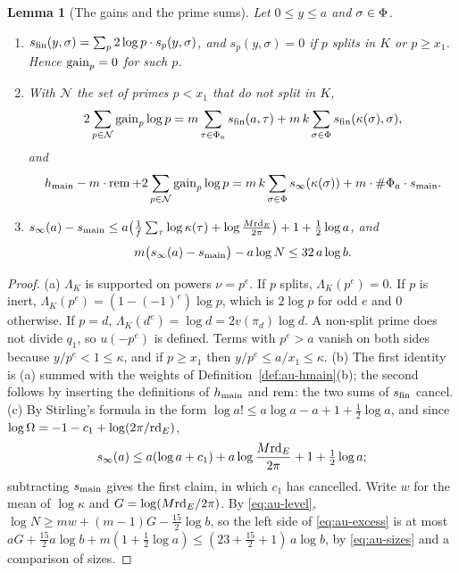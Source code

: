 \documentclass[10pt]{amsart}
\newtheorem{lemma}[theorem]{Lemma}
\theoremstyle{definition}
\theoremstyle{remark}
\begin{document}
\begin{lemma}[The gains and the prime sums]\label{au:gains}
Let $0\le y\le a$ and $\sigma\in\Phi$.
\begin{enumerate}
\item[(a)] $s_{\mathrm{fin}}(y,\sigma)=\sum_p2\log p\cdot s_p(y,\sigma)$, and $s_p(y,\sigma)=0$ if $p$
splits in $K$ or $p\ge x_1$. Hence $\operatorname{gain}_p=0$ for such $p$.
\item[(b)] With $\mathcal N$ the set of primes $p<x_1$ that do not split in $K$,
\[
2\sum_{p\in\mathcal N}\operatorname{gain}_p\log p=m\sum_{\tau\in\Phi_a}s_{\mathrm{fin}}(a,\tau)+m\,k\sum_{\sigma\in\Phi}
s_{\mathrm{fin}}(\kappa(\sigma),\sigma),
\]
and
\begin{equation}\label{eq:au-cancel}
h_{\mathrm{main}}-m\cdot\operatorname{rem}+2\sum_{p\in\mathcal N}\operatorname{gain}_p\log p=m\,k\sum_{\sigma\in\Phi}s_\infty
(\kappa(\sigma))+m\cdot\#\Phi_a\cdot s_{\mathrm{main}} .
\end{equation}
\item[(c)] $s_\infty(a)-s_{\mathrm{main}}\le a\bigl(\tfrac1f\sum_\tau\log\kappa(\tau)+\log\frac{M\mathrm{rd}_E}
{2\pi}\bigr)+1+\tfrac12\log a$, and
\begin{equation}\label{eq:au-excess}
m\bigl(s_\infty(a)-s_{\mathrm{main}}\bigr)-a\log N\le32\,a\log b .
\end{equation}
\end{enumerate}
\end{lemma}
\begin{proof}
(a) $\Lambda_K$ is supported on powers $\nu=p^e$. If $p$ splits, $\Lambda_K(p^e)=0$. If $p$ is
inert, $\Lambda_K(p^e)=(1-(-1)^e)\log p$, which is $2\log p$ for odd $e$ and $0$ otherwise. If
$p=d$, $\Lambda_K(d^e)=\log d=2v(\pi_d)\log d$. A non-split prime does not divide $q_1$, so
$u(-p^e)$ is defined. Terms with $p^e>a$ vanish on both sides because $y/p^e<1\le\kappa$, and if
$p\ge x_1$ then $y/p^e\le a/x_1\le\kappa$. (b) The first identity is (a) summed with the weights
of Definition~\ref{def:au-hmain}(b); the second follows by inserting the definitions of
$h_{\mathrm{main}}$ and $\operatorname{rem}$: the two sums of $s_{\mathrm{fin}}$ cancel. (c) By Stirling's formula in the form
$\log a!\le a\log a-a+1+\tfrac12\log a$, and since $\log\Omega=-1-c_1+\log(2\pi/\mathrm{rd}_E)$,
\[
s_\infty(a)\le a(\log a+c_1)+a\log\frac{M\mathrm{rd}_E}{2\pi}+1+\tfrac12\log a ;
\]
subtracting $s_{\mathrm{main}}$ gives the first claim, in which $c_1$ has cancelled. Write $w$ for the mean
of $\log\kappa$ and $G=\log(M\mathrm{rd}_E/2\pi)$. By \eqref{eq:au-level},
$\log N\ge mw+(m-1)G-\tfrac{15}2\log b$, so the left side of \eqref{eq:au-excess} is at most
$aG+\tfrac{15}2a\log b+m(1+\tfrac12\log a)\le(23+\tfrac{15}2+1)\,a\log b$, by
\eqref{eq:au-sizes} and a comparison of sizes.
\end{proof}
\end{document}

